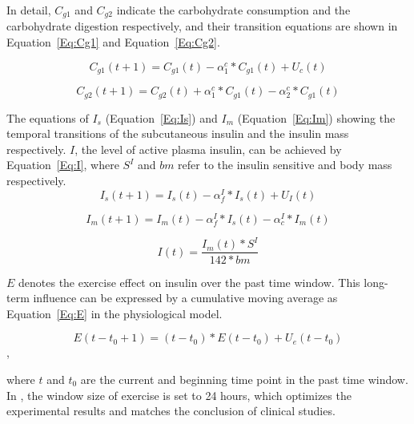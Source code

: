 
In detail, $C_{g1}$  and $C_{g2}$ indicate the carbohydrate consumption and the carbohydrate digestion respectively, and their transition equations are shown
in Equation~\ref{Eq:Cg1} and Equation~\ref{Eq:Cg2}.

\begin{equation}\label{Eq:Cg1}
C_{g1}(t+1)=C_{g1}(t)-\alpha_{1}^c*C_{g1}(t)+U_{c}(t)
\end{equation}

\begin{equation}\label{Eq:Cg2}
C_{g2}(t+1)=C_{g2}(t)+\alpha_{1}^c*C_{g1}(t)-\alpha_{2}^c*C_{g1}(t)
\end{equation}

The equations of $I_{s}$ (Equation~\ref{Eq:Is}) and $I_{m}$ (Equation~\ref{Eq:Im}) showing the temporal transitions of  the subcutaneous insulin
and the insulin mass respectively. $I$, the level of active plasma insulin, can be achieved by Equation~\ref{Eq:I}, where $S^I$ and $bm$ refer to the
insulin sensitive and body mass respectively.
\begin{equation}\label{Eq:Is}
I_{s}(t+1)=I_{s}(t)-\alpha_{f}^I*I_{s}(t)+U_{I}(t)
\end{equation}


\begin{equation}\label{Eq:Im}
I_{m}(t+1)=I_{m}(t)-\alpha_{f}^I*I_{s}(t)-\alpha_c^I*I_{m}(t)
\end{equation}

\begin{equation}\label{Eq:I}
I(t)=\frac{I_{m}(t)*S^I}{142*bm}
\end{equation}

$E$ denotes the exercise effect on insulin over the past time window. This long-term influence can be
expressed by a cumulative moving average as Equation~\ref{Eq:E} in the physiological model.

\begin{equation}\label{Eq:E}
E(t-t_0+1)=(t-t_0)*E(t-t_0)+U_{e}(t-t_0)
\end{equation},

where $t$ and $t_0$ are the current and beginning time point in the past time window. In \sysname,
the window size of exercise is set to 24 hours, which optimizes the experimental results and matches the conclusion
of clinical studies.

